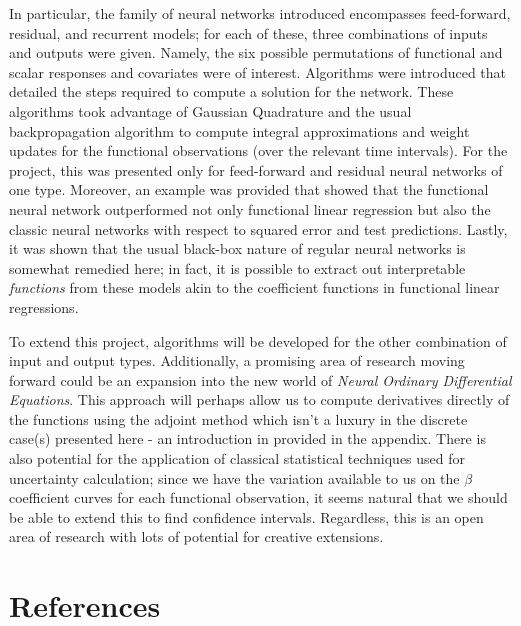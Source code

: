 \documentclass{article}
\begin{document}
\noindent In particular, the family of neural networks introduced encompasses feed-forward, residual, and recurrent models; for each of these, three combinations of inputs and outputs were given. Namely, the six possible permutations of functional and scalar responses and covariates were of interest. Algorithms were introduced that detailed the steps required to compute a solution for the network. These algorithms took advantage of Gaussian Quadrature and the usual backpropagation algorithm to compute integral approximations and weight updates for the functional observations (over the relevant time intervals). For the project, this was presented only for feed-forward and residual neural networks of one type. Moreover, an example was provided that showed that the functional neural network outperformed not only functional linear regression but also the classic neural networks with respect to squared error and test predictions. Lastly, it was shown that the usual black-box nature of regular neural networks is somewhat remedied here; in fact, it is possible to extract out interpretable \textit{functions} from these models akin to the coefficient functions in functional linear regressions.

\noindent To extend this project, algorithms will be developed for the other combination of input and output types. Additionally, a promising area of research moving forward could be an expansion into the new world of \textit{Neural Ordinary Differential Equations}. This approach will perhaps allow us to compute derivatives directly of the functions using the adjoint method which isn't a luxury in the discrete case(s) presented here - an introduction in provided in the appendix. There is also potential for the application of classical statistical techniques used for uncertainty calculation; since we have the variation available to us on the $\beta$ coefficient curves for each functional observation, it seems natural that we should be able to extend this to find confidence intervals. Regardless, this is an open area of research with lots of potential for creative extensions.



\newpage
\section{References}
\label{sec:six}
\nocite{ESL, resnetCode}
\nocite{jseam2_2019}
\nocite{rscratch}
\nocite{ode_imp2, odeVid, aisc_2019, reticulate, kaustav1987, drchainsaw_2019, R1, R2, cao}
\printbibliography[heading= none]{}
\end{document}
